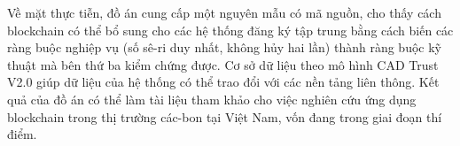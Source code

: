 Về mặt thực tiễn, đồ án cung cấp một nguyên mẫu có mã nguồn, cho thấy cách blockchain có thể bổ sung cho các hệ thống đăng ký tập trung bằng cách biến các ràng buộc nghiệp vụ (số sê-ri duy nhất, không hủy hai lần) thành ràng buộc kỹ thuật mà bên thứ ba kiểm chứng được. Cơ sở dữ liệu theo mô hình CAD Trust V2.0 giúp dữ liệu của hệ thống có thể trao đổi với các nền tảng liên thông. Kết quả của đồ án có thể làm tài liệu tham khảo cho việc nghiên cứu ứng dụng blockchain trong thị trường các-bon tại Việt Nam, vốn đang trong giai đoạn thí điểm.

